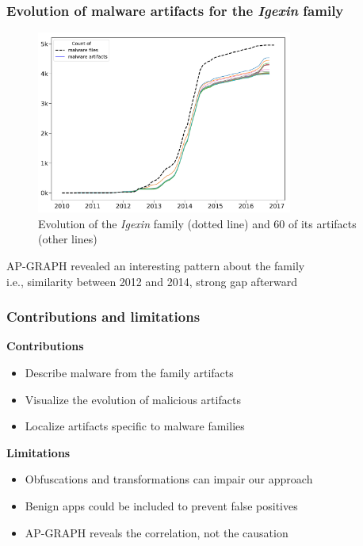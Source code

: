 \begin{frame}
    \frametitle{Evolution of malware artifacts for the \textit{Igexin} family}
    \centering

    \begin{figure}[!ht]
        \includegraphics[width=0.75\textwidth]{figures/apgraph/igexin.pdf}
        \caption{\scriptsize{Evolution of the \textit{Igexin} family (dotted line) and 60 of its artifacts (other lines)}}
    \end{figure}

    \vspace{-15pt}

    AP-GRAPH revealed an interesting pattern about the family \\
    \small{i.e., similarity between 2012 and 2014, strong gap afterward}

\end{frame}

\begin{frame}
    \frametitle{Contributions and limitations}

    \begin{block}{}
        \centering
        \textbf{Contributions}
    \end{block}
    \begin{itemize}
        \item Describe malware from the family artifacts
        \item Visualize the evolution of malicious artifacts 
        \item Localize artifacts specific to malware families 
    \end{itemize}

    \begin{block}{}
        \centering
        \textbf{Limitations}
    \end{block}
    \begin{itemize}
        \item Obfuscations and transformations can impair our approach
        \item Benign apps could be included to prevent false positives
        \item AP-GRAPH reveals the correlation, not the causation
    \end{itemize}

\end{frame}
